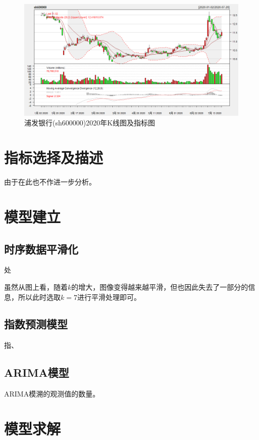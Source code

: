 \documentclass[10pt]{ctexart}
\begin{document}
\begin{figure}[H]
	\centering
	\includegraphics[width=0.95\linewidth]{figs/1}
	\caption[图1]{浦发银行(sh600000)2020年K线图及指标图}
	\label{fig:1}
\end{figure}






\section{指标选择及描述}
由于在此也不作进一步分析。

\section{模型建立}

\subsection{时序数据平滑化}

处


虽然从图上看，随着$k$的增大，图像变得越来越平滑，但也因此失去了一部分的信息，所以此时选取$k=7$进行平滑处理即可。

\subsection{指数预测模型}

指、


\subsection{ARIMA模型}

ARIMA模溯的观测值的数量。


\section{模型求解}
\end{document}
